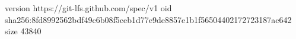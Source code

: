 version https://git-lfs.github.com/spec/v1
oid sha256:8fd8992562bdf49c6b08f5ceb1d77e9de8857e1b1f56504402172723187ac642
size 43840
